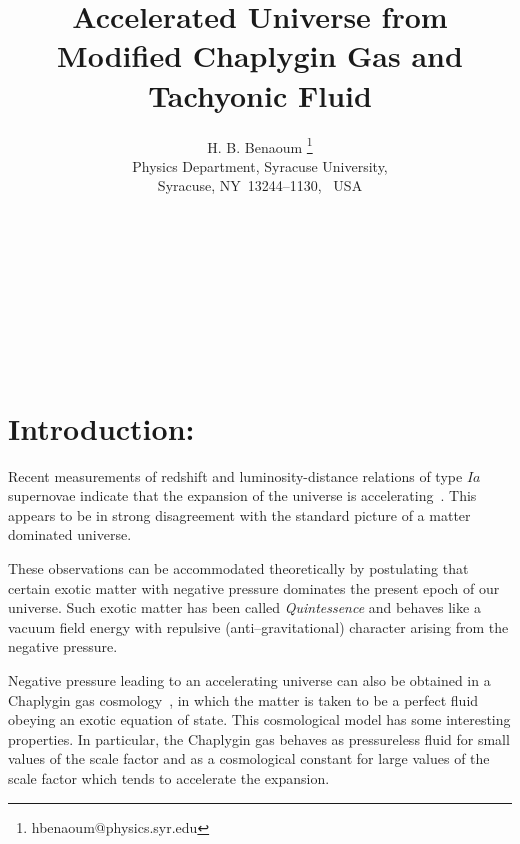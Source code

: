 \documentclass[a4paper,12pt,a4]{article}
\begin{document}
 
\title{\bf Accelerated Universe from   
Modified Chaplygin Gas and Tachyonic Fluid   
} 
\author{ H. B. Benaoum \footnote{hbenaoum@physics.syr.edu}
  \\
Physics Department, Syracuse University, \\
Syracuse, NY~13244--1130,~ USA }
\date{}
\maketitle
~\\
~\\ 
~\\
~\\
~\\
\newpage
~\\  
\section{Introduction:}  

Recent measurements of redshift and luminosity-distance relations of 
type $Ia$ supernovae indicate that the expansion of
the universe is accelerating~\cite{per, rie}. This appears to be in 
strong disagreement with the standard picture of a matter dominated 
universe.  
 
These observations can be accommodated theoretically by postulating  
that certain exotic matter with negative pressure dominates  
the present epoch of our universe. Such exotic matter has been called 
{\em Quintessence} and behaves like a vacuum field energy with repulsive 
(anti--gravitational) character arising from the negative pressure. 

Negative pressure leading to an accelerating universe can also 
be obtained in a Chaplygin gas cosmology~\cite{pas},
in which the matter is taken to be a perfect fluid 
obeying an exotic equation of state. This cosmological model has some 
interesting properties. In particular, the Chaplygin gas behaves as 
pressureless fluid for small values of the scale factor and as a 
cosmological constant for large values of the scale factor which tends to 
accelerate the expansion.  
 
\end{document}

